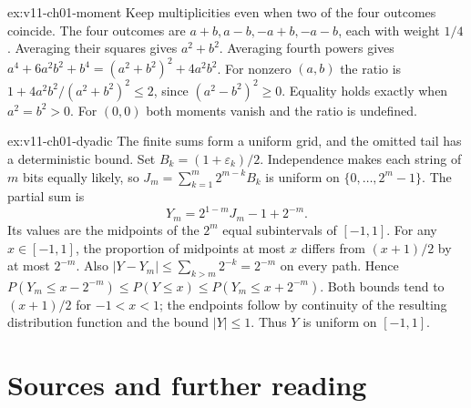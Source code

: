 \begin{solution}{ex:v11-ch01-moment}
\idea Keep multiplicities even when two of the four outcomes coincide.
\writeup The four outcomes are $a+b,a-b,-a+b,-a-b$, each with weight $1/4$. Averaging their squares gives $a^2+b^2$. Averaging fourth powers gives $a^4+6a^2b^2+b^4=(a^2+b^2)^2+4a^2b^2$. For nonzero $(a,b)$ the ratio is $1+4a^2b^2/(a^2+b^2)^2\le2$, since $(a^2-b^2)^2\ge0$. Equality holds exactly when $a^2=b^2>0$. For $(0,0)$ both moments vanish and the ratio is undefined.
\end{solution}

\begin{solution}{ex:v11-ch01-dyadic}
\idea The finite sums form a uniform grid, and the omitted tail has a deterministic bound.
\writeup Set $B_k=(1+\varepsilon_k)/2$. Independence makes each string of $m$ bits equally likely, so $J_m=\sum_{k=1}^m2^{m-k}B_k$ is uniform on $\{0,\dots,2^m-1\}$. The partial sum is
\[
Y_m=2^{1-m}J_m-1+2^{-m}.
\]
Its values are the midpoints of the $2^m$ equal subintervals of $[-1,1]$. For any $x\in[-1,1]$, the proportion of midpoints at most $x$ differs from $(x+1)/2$ by at most $2^{-m}$. Also $|Y-Y_m|\le\sum_{k>m}2^{-k}=2^{-m}$ on every path. Hence $P(Y_m\le x-2^{-m})\le P(Y\le x)\le P(Y_m\le x+2^{-m})$. Both bounds tend to $(x+1)/2$ for $-1<x<1$; the endpoints follow by continuity of the resulting distribution function and the bound $|Y|\le1$. Thus $Y$ is uniform on $[-1,1]$.
\end{solution}

\section*{Sources and further reading}

